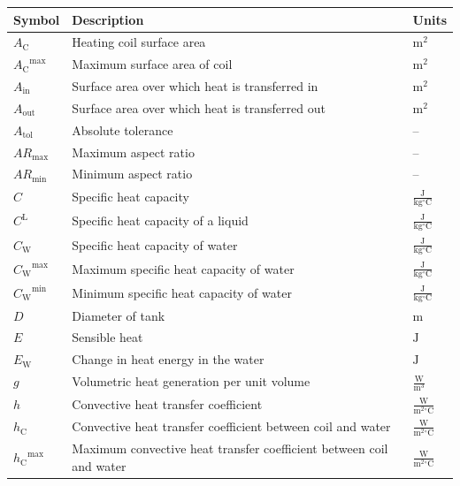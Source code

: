\documentclass[12pt]{article}
\begin{document}
\begin{longtabu}{l X[l] l}
\toprule
\textbf{Symbol} & \textbf{Description} & \textbf{Units}
\\
\midrule
\endhead
${A_{\text{C}}}$ & Heating coil surface area & ${\text{m}^{2}}$
\\
${{A_{\text{C}}}^{\text{max}}}$ & Maximum surface area of coil & ${\text{m}^{2}}$
\\
${A_{\text{in}}}$ & Surface area over which heat is transferred in & ${\text{m}^{2}}$
\\
${A_{\text{out}}}$ & Surface area over which heat is transferred out & ${\text{m}^{2}}$
\\
${A_{\text{tol}}}$ & Absolute tolerance & --
\\
${\mathit{AR}_{\text{max}}}$ & Maximum aspect ratio & --
\\
${\mathit{AR}_{\text{min}}}$ & Minimum aspect ratio & --
\\
$C$ & Specific heat capacity & $\frac{\text{J}}{\text{kg}{}^{\circ}\text{C}}$
\\
${C^{\text{L}}}$ & Specific heat capacity of a liquid & $\frac{\text{J}}{\text{kg}{}^{\circ}\text{C}}$
\\
${C_{\text{W}}}$ & Specific heat capacity of water & $\frac{\text{J}}{\text{kg}{}^{\circ}\text{C}}$
\\
${{C_{\text{W}}}^{\text{max}}}$ & Maximum specific heat capacity of water & $\frac{\text{J}}{\text{kg}{}^{\circ}\text{C}}$
\\
${{C_{\text{W}}}^{\text{min}}}$ & Minimum specific heat capacity of water & $\frac{\text{J}}{\text{kg}{}^{\circ}\text{C}}$
\\
$D$ & Diameter of tank & ${\text{m}}$
\\
$E$ & Sensible heat & ${\text{J}}$
\\
${E_{\text{W}}}$ & Change in heat energy in the water & ${\text{J}}$
\\
$g$ & Volumetric heat generation per unit volume & $\frac{\text{W}}{\text{m}^{3}}$
\\
$h$ & Convective heat transfer coefficient & $\frac{\text{W}}{\text{m}^{2}{}^{\circ}\text{C}}$
\\
${h_{\text{C}}}$ & Convective heat transfer coefficient between coil and water & $\frac{\text{W}}{\text{m}^{2}{}^{\circ}\text{C}}$
\\
${{h_{\text{C}}}^{\text{max}}}$ & Maximum convective heat transfer coefficient between coil and water & $\frac{\text{W}}{\text{m}^{2}{}^{\circ}\text{C}}$
\\

\end{longtabu}
\end{document}
